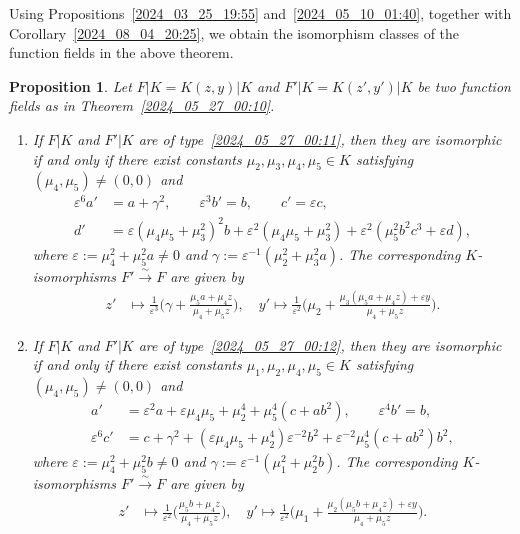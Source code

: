 \documentclass[12pt,reqno]{amsart}
\newtheorem{prop}[thm]{Proposition}
\theoremstyle{definition}
\newcommand{\ga}{\gamma}
\newcommand{\eps}{\varepsilon}
\begin{document}
Using Propositions~\ref{2024_03_25_19:55} and~\ref{2024_05_10_01:40}, together with Corollary~\ref{2024_08_04_20:25}, we obtain the isomorphism classes of the function fields in the above theorem.

\begin{prop} \label{2024_07_22_21:20} 
Let $F|K=K(z,y)|K$ and $F'|K=K(z',y')|K$ be two function fields as in Theorem~\ref{2024_05_27_00:10}.
\begin{enumerate}[\upshape (a)]
    \item 
    If $F|K$ and $F'|K$ are of type~\ref{2024_05_27_00:11}, then they are isomorphic if and only if there exist constants $\mu_2,\mu_3,\mu_4,\mu_5 \in K$ satisfying $(\mu_4,\mu_5)\neq (0,0)$ and
    \begin{align*}
        \eps^6 a' &= a + \ga^2, \qquad \eps^3 b' = b, \qquad c' = \eps c, \\
        d' &= \eps ( \mu_4 \mu_5 + \mu_3^2)^2 b + \eps^2 (\mu_4 \mu_5 + \mu_3^2) + \eps^2 ( \mu_5^2 b^2 c^3 + \eps d),
    \end{align*}
    where $\eps:= \mu_4^2 + \mu_5^2 a \neq 0$ and $\ga := \eps^{-1}(\mu_2^2 + \mu_3^2 a)$.
    The corresponding $K$-isomorphisms $F' \overset\sim\to F$ are given by
    \begin{align*}
        z' &\mapsto \frac 1 {\eps^3} \bigg( \ga + \frac{\mu_5 a + \mu_4 z}{\mu_4 + \mu_5 z} \bigg), \quad
        y' \mapsto \frac 1 {\eps^2} \bigg( \mu_2 + \frac{\mu_3 (\mu_5 a + \mu_4 z) + \eps y}{\mu_4 + \mu_5 z} \bigg).
    \end{align*}
    
    \item 
    If $F|K$ and $F'|K$ are of type~\ref{2024_05_27_00:12}, then they are isomorphic if and only if there exist constants $\mu_1,\mu_2,\mu_4,\mu_5 \in K$ satisfying $(\mu_4,\mu_5) \neq (0,0)$ and
    \begin{align*}
        a' &= \eps^2 a + \eps \mu_4 \mu_5 + \mu_2^4 + \mu_5^4 (c + a b^2), \qquad \eps^4 b' = b, \\
        \eps^6 c' &= c + \ga^2 + (\eps \mu_4 \mu_5 + \mu_2^4) \eps^{-2} b^2 + \eps^{-2} \mu_5^4 (c + ab^2) b^2,
    \end{align*}
    where $\eps := \mu_4^2 + \mu_5^2 b \neq 0$ and $\ga := \eps^{-1} (\mu_1^2 + \mu_2^2 b)$.
    The corresponding $K$-isomorphisms $F' \overset\sim\to F$ are given by
    \begin{align*}
        z' &\mapsto \frac 1 {\eps^2} \bigg( \frac{\mu_5 b + \mu_4 z}{\mu_4 + \mu_5 z}\bigg), \quad
        y' \mapsto \frac 1 {\eps^2} \bigg( \mu_1 + \frac{\mu_2 (\mu_5 b + \mu_4 z) + \eps y}{\mu_4 + \mu_5 z} \bigg).
    \end{align*}
    

\end{enumerate}
\end{prop}
\end{document}
